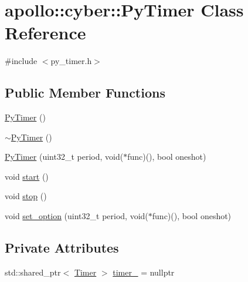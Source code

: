 \hypertarget{classapollo_1_1cyber_1_1PyTimer}{\section{apollo\-:\-:cyber\-:\-:Py\-Timer Class Reference}
\label{classapollo_1_1cyber_1_1PyTimer}
}


{\ttfamily \#include $<$py\-\_\-timer.\-h$>$}

\subsection*{Public Member Functions}
\begin{DoxyCompactItemize}
\item 
\hyperlink{classapollo_1_1cyber_1_1PyTimer_a8059a10bbe392b52a85f40b192cbad90}{Py\-Timer} ()
\item 
\hyperlink{classapollo_1_1cyber_1_1PyTimer_a90983ba3cac4c8433c3a9250d3afb3e0}{$\sim$\-Py\-Timer} ()
\item 
\hyperlink{classapollo_1_1cyber_1_1PyTimer_a6296da3fefc0b123dbbcf63d8d40d464}{Py\-Timer} (uint32\-\_\-t period, void($\ast$func)(), bool oneshot)
\item 
void \hyperlink{classapollo_1_1cyber_1_1PyTimer_aabe64a06d1256a6a3f36e2b3b2365404}{start} ()
\item 
void \hyperlink{classapollo_1_1cyber_1_1PyTimer_abae0419ab636edfb674086ab197c97cf}{stop} ()
\item 
void \hyperlink{classapollo_1_1cyber_1_1PyTimer_a6b8a65a2540c21b95017067894914c02}{set\-\_\-option} (uint32\-\_\-t period, void($\ast$func)(), bool oneshot)
\end{DoxyCompactItemize}
\subsection*{Private Attributes}
\begin{DoxyCompactItemize}
\item 
std\-::shared\-\_\-ptr$<$ \hyperlink{classapollo_1_1cyber_1_1Timer}{Timer} $>$ \hyperlink{classapollo_1_1cyber_1_1PyTimer_ab359c52c3a7f0727f7337be165b01b34}{timer\-\_\-} = nullptr
\end{DoxyCompactItemize}


